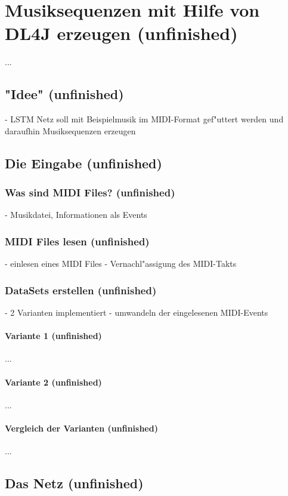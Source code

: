 \chapter{Musiksequenzen mit Hilfe von DL4J erzeugen (unfinished)}
{ ...
\section{"Idee" (unfinished)}
- LSTM Netz soll mit Beispielmusik im MIDI-Format gef"uttert werden und daraufhin Musiksequenzen erzeugen

\section{Die Eingabe (unfinished)}
\subsection{Was sind MIDI Files? (unfinished)}
- Musikdatei, Informationen als Events

\subsection{MIDI Files lesen (unfinished)}
- einlesen eines MIDI Files
- Vernachl"assigung des MIDI-Takts

\subsection{DataSets erstellen (unfinished)}
- 2 Varianten implementiert
- umwandeln der eingelesenen MIDI-Events
\subsubsection{Variante 1 (unfinished)}
...
\subsubsection{Variante 2 (unfinished)}
...
\subsubsection{Vergleich der Varianten (unfinished)}
...


\section{Das Netz (unfinished)}


}

